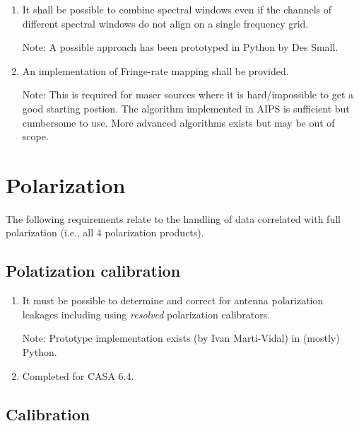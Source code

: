 \documentclass[11pt,a4paper]{article}
\begin{document}
\begin{enumerate}[subseclist]
\item It shall be possible to combine spectral windows even if the
  channels of different spectral windows do not align on a single
  frequency grid.

  Note: A possible approach has been prototyped in Python by Des Small.

\item An implementation of Fringe-rate mapping shall be provided.

  Note: This is required for maser sources where it is hard/impossible
  to get a good starting postion.  The algorithm implemented in AIPS
  is sufficient but cumbersome to use.  More advanced algorithms
  exists but may be out of scope.

\end{enumerate}


\section{Polarization}

The following requirements relate to the handling of data correlated
with full polarization (i.e., all 4 polarization products).

\subsection{ Polatization calibration}

\begin{enumerate}[subseclist]

\item It must be possible to determine and correct for antenna
  polarization leakages including using \emph{resolved} polarization
  calibrators.

  Note: Prototype implementation exists (by Ivan Marti-Vidal) in
  (mostly) Python.

\item Completed for CASA 6.4.

\end{enumerate}


\subsection{Calibration}
\end{document}

